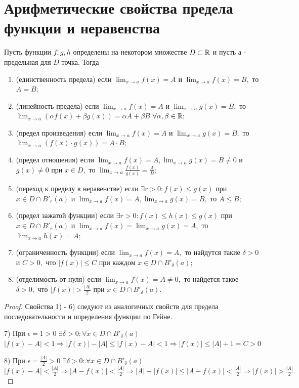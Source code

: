 	\section{Арифметические свойства предела функции и неравенства}
	
	\begin{theorem}
		Пусть функции $f, g, h$ определены на некотором множестве $D \subset \mathbb R$ и пусть $а$ - предельная для $D$ точка. Тогда
		\begin{enumerate}
			\item (единственность предела) если $\displaystyle \lim_{x \to a} f(x) = A$ и $\displaystyle \lim_{x \to a} f(x) = B,$ то $A = B$;
			\item (линейность предела) если $\displaystyle \lim_{x \to a} f(x) = A$ и $\displaystyle \lim_{x \to a} g(x) = B,$ то $\displaystyle \lim_{x \to a} (\alpha f(x) + \beta g(x)) = \alpha A + \beta B$ $\forall \alpha, \beta \in \mathbb R;$
			\item (предел произведения) если $\displaystyle \lim_{x \to a} f(x) = A$ и $\displaystyle \lim_{x \to a} g(x) = B,$ то $\displaystyle \lim_{x \to a} (f(x) \cdot g(x)) = A \cdot B;$
			\item (предел отношения) если $\displaystyle \lim_{x \to a} f(x) = A, \lim_{x \to a} g(x) = B \neq 0$	и $g(x) \neq 0$ при $x \in D,$ то $\displaystyle \lim_{x \to a} \frac{f(x)}{g(x)} = \frac{A}{B};$
			\item (переход к пределу в неравенстве) если $\exists r > 0 : f(x) \leqslant g(x)$ при $x \in D \cap B'_r(a)$ и $\displaystyle \lim_{x \to a} f(x) = A, \lim_{x \to a} g(x) = B,$ то $A \leqslant B;$
			\item (предел зажатой функции) если $\exists r > 0 : f(x) \leqslant h(x) \leqslant g(x)$ при $x \in D \cap B'_r(a)$ и $\displaystyle \lim_{x \to a} f(x) = \lim_{x \to a} g(x) = A,$ то $\displaystyle \lim_{x \to a} h(x) = A;$
			\item (ограниченность функции) если $\displaystyle \lim_{x \to a} f(x) = A,$ то найдутся такие $\delta > 0$ и $C > 0,$ что $|f(x)| \leqslant C$ при каждом $x \in D \cap B'_{\delta}(a);$
			\item (отделимость от нуля) если $\displaystyle \lim_{x \to a} f(x) = A \neq 0,$ то найдется такое $\delta > 0,$ что $|f(x)| > \frac{|A|}{2}$ при $x \in D \cap B'_{\delta}(a).$
		\end{enumerate}
	\end{theorem}
	
	\begin{proof}
		Свойства 1) - 6) следуют из аналогичных свойств для предела последовательности и определения функции по Гейне.
		
		7) При $\epsilon = 1 > 0$ $\exists \delta > 0: \forall x \in D \cap B'_{\delta}(a)$ $|f(x) - A| < 1 \Rightarrow |f(x)| - |A| \leqslant |f(x) - A| < 1 \Rightarrow |f(x)| \leqslant |A| + 1 = C > 0$
		
		8) При $\epsilon = \frac{|A|}{2} > 0$ $\exists \delta > 0: \forall x \in D \cap B'_{\delta}(a)$ $|f(x) - A| < \frac{|A|}{2} \Rightarrow |A - f(x)| < \frac{|A|}{2} \Rightarrow |A| - |f(x)| \leqslant |A - f(x)| < \frac{|A|}{2} \Rightarrow |f(x)| > \frac{|A|}{2}.$
	\end{proof}
	
